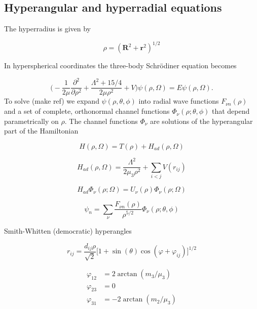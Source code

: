\documentclass{article}
\begin{document}
\subsection{Hyperangular and hyperradial equations}

The hyperradius is given by

\begin{equation}
\rho = (\mathbf{R}^{2} + \mathbf{r}^{2})^{1/2}
\end{equation}

In hyperspherical coordinates the three-body Schr{\"o}diner equation becomes

\begin{equation}
\Bigg(-\frac{1}{2 \mu}\frac{\partial^2}{ \partial \rho^2} + \frac{\Lambda^2 + 15/4}{2 \mu \rho^2} + V \Bigg)\psi(\rho,\Omega) = E\psi(\rho,\Omega).
\end{equation}
To solve (make ref) we expand $\psi(\rho,\theta,\phi)$ into radial wave functions $F_{\nu n}(\rho)$ and a set of complete, orthonormal channel functions $\Phi_{\nu}(\rho;\theta,\phi)$ that depend parametrically on $\rho$. The channel functions $\Phi_{\nu}$ are solutions of the hyperangular part of the Hamiltonian

\begin{equation}
H(\rho,\Omega) = T(\rho) + H_{ad}(\rho,\Omega)
\end{equation}

\begin{equation}
H_{ad}(\rho,\Omega) = \frac{\Lambda^2}{2 \mu_{3} \rho^2} + \sum_{i<j} V(r_{ij})
\end{equation}

\begin{equation}
H_{ad} \Phi_{\nu}{(\rho ; \Omega)}= U_{\nu}{(\rho)} \Phi_{\nu}{(\rho ; \Omega)}
\end{equation}


\begin{equation}
\psi_{n} = \sum_{\nu} \frac{F_{\nu n}(\rho)}{\rho^{5/2}} \Phi_{\nu}{(\rho;\theta,\phi)}
\end{equation}





Smith-Whitten (democratic) hyperangles

\begin{equation}
r_{ij} = \frac{d_{ij} \rho}{\sqrt{2}} \Big[1+\sin(\theta) \cos{(\varphi + \varphi_{ij})}\Big]^{1/2}
\end{equation}

\begin{align*}
\varphi_{12} &= 2 \arctan{(m_{3} / \mu_{3})} \\
\varphi_{23} &= 0 \\
\varphi_{31} &= -2 \arctan{(m_{2} / \mu_{3})}
\end{align*}
\end{document}
